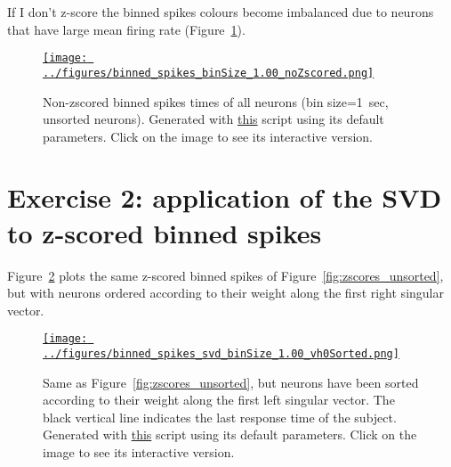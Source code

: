 \documentclass[12pt]{article}
\begin{document}
If I don't z-score the binned spikes colours become imbalanced due to neurons that
have large mean firing rate (Figure~\ref{fig:zscores_unsorted_noZscored}).

\begin{figure}[H]
    \begin{center}
        \href{https://www.gatsby.ucl.ac.uk/~rapela/neuroinformatics/2023/ws5/figures/binned_spikes_binSize_1.00_noZscored.html}{\texttt{[image: ../figures/binned\_spikes\_binSize\_1.00\_noZscored.png]}}

        \caption{Non-zscored binned spikes times of all neurons (bin
        size=1~sec, unsorted neurons).  Generated with
        \href{https://github.com/joacorapela/neuroinformatics23/blob/master/worksheets/ws5/mySolution/code/scripts/doEx1Plotly.py}{this}
        script using its default parameters. Click on the image to see its
        interactive version.}

        \label{fig:zscores_unsorted_noZscored}
    \end{center}
\end{figure}

\section*{Exercise 2: application of the SVD to z-scored binned spikes}

Figure~\ref{fig:zscores_vh0Sorted} plots the same z-scored binned spikes of
Figure~\ref{fig:zscores_unsorted}, but with neurons ordered according to their
weight along the first right singular vector.


\begin{figure}[H]
    \begin{center}
        \href{https://www.gatsby.ucl.ac.uk/~rapela/neuroinformatics/2023/ws5/figures/binned_spikes_svd_binSize_1.00_vh0Sorted.html}{\texttt{[image: ../figures/binned\_spikes\_svd\_binSize\_1.00\_vh0Sorted.png]}}

        \caption{Same as Figure~\ref{fig:zscores_unsorted}, but neurons have
        been sorted according to their weight along the first left singular
        vector. The black vertical line indicates the last response time of the
        subject. Generated with
        \href{https://github.com/joacorapela/neuroinformatics23/blob/master/worksheets/ws5/mySolution/code/scripts/doEx2Plotly.py}{this}
        script using its default parameters. Click on the image to see its
        interactive version.}

        \label{fig:zscores_vh0Sorted}
    \end{center}
\end{figure}
\end{document}

